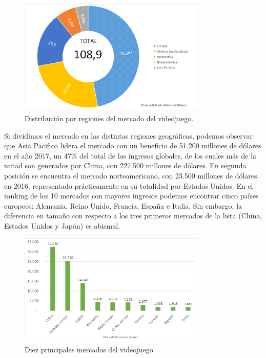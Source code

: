 \begin{figure}[h]
    \centering
    \includegraphics[width=0.8\textwidth]{images/estadodelarte/mercado/distribucion-mercado-mundial}
    \caption{Distribución por regiones del mercado del videojuego.}
\end{figure}

Si dividimos el mercado en las distintas regiones geográficas, podemos observar que Asia Pacifico lidera el mercado con un beneficio de 51.200 millones de dólares en el año 2017, un 47\% del total de los ingresos globales, de los cuales más de la mitad son generados por China, con 227.500 millones de dólares. En segunda posición se encuentra el mercado norteamericano, con 23.500 millones de dólares en 2016, representado prácticamente en su totalidad por Estados Unidos. En el ranking de los 10 mercados con mayores ingresos podemos encontrar cinco países europeos: Alemania, Reino Unido, Francia, España e Italia. Sin embargo, la diferencia en tamaño con respecto a los tres primeros mercados de la lista (China, Estados Unidos y Japón) es abismal\cite{libro_blanco}.

\begin{figure}[h]
    \centering
    \includegraphics[width=0.8\textwidth]{images/estadodelarte/mercado/10-mayores-mercados}
    \caption{Diez principales mercados del videojuego.}
\end{figure}

